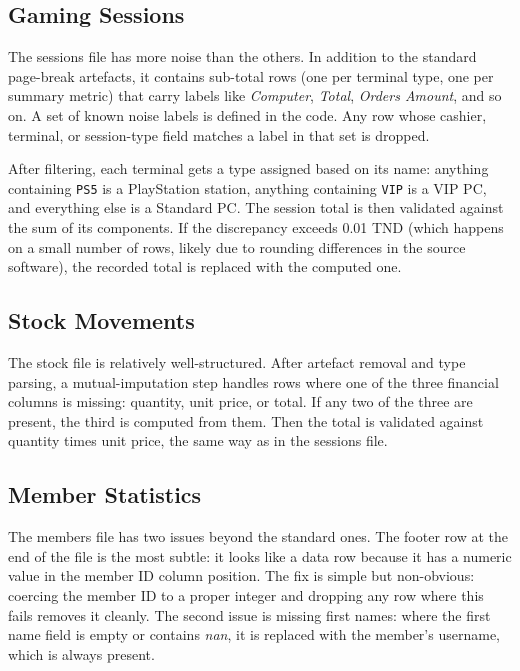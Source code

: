 \documentclass[12pt, a4paper]{report}
\begin{document}
\subsection{Gaming Sessions}

The sessions file has more noise than the others. In addition to the standard
page-break artefacts, it contains sub-total rows (one per terminal type, one per
summary metric) that carry labels like \textit{Computer}, \textit{Total},
\textit{Orders Amount}, and so on. A set of known noise labels is defined in the
code. Any row whose cashier, terminal, or session-type field matches a label in that
set is dropped.

After filtering, each terminal gets a type assigned based on its name: anything
containing \texttt{PS5} is a PlayStation station, anything containing \texttt{VIP}
is a VIP PC, and everything else is a Standard PC. The session total is then
validated against the sum of its components. If the discrepancy exceeds 0.01 TND
(which happens on a small number of rows, likely due to rounding differences in the
source software), the recorded total is replaced with the computed one.

\subsection{Stock Movements}

The stock file is relatively well-structured. After artefact removal and type
parsing, a mutual-imputation step handles rows where one of the three financial
columns is missing: quantity, unit price, or total. If any two of the three are
present, the third is computed from them. Then the total is validated against
quantity times unit price, the same way as in the sessions file.

\subsection{Member Statistics}

The members file has two issues beyond the standard ones. The footer row at the end
of the file is the most subtle: it looks like a data row because it has a numeric
value in the member ID column position. The fix is simple but non-obvious: coercing
the member ID to a proper integer and dropping any row where this fails removes it
cleanly. The second issue is missing first names: where the first name field is
empty or contains \textit{nan}, it is replaced with the member's username, which is
always present.
\end{document}
